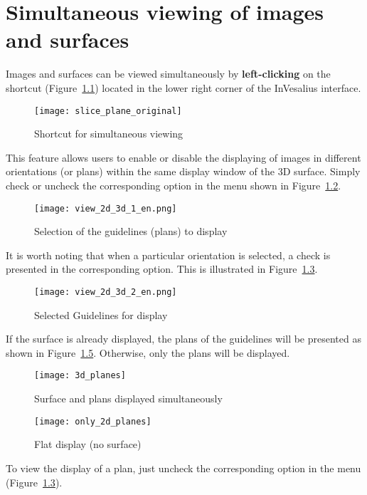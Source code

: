 \chapter{Simultaneous viewing of images and surfaces}

Images and surfaces can be viewed simultaneously by \textbf{left-clicking} on the shortcut (Figure~\ref{fig:slice_plane_original}) located in the lower right corner of the InVesalius interface.

\begin{figure}[!htb]
\centering
\texttt{[image: slice\_plane\_original]}
\caption{Shortcut for simultaneous viewing}
\label{fig:slice_plane_original}
\end{figure}

This feature allows users to enable or disable the displaying of images in different orientations (or plans) within the same display window of the 3D surface. Simply check or uncheck the corresponding option in the menu shown in Figure~\ref{fig:view_2d_3d_1}.

\begin{figure}[!htb]
\centering
\texttt{[image: view\_2d\_3d\_1\_en.png]}
\caption{Selection of the guidelines (plans) to display}
\label{fig:view_2d_3d_1}
\end{figure}

It is worth noting that when a particular orientation is selected, a check is presented in the corresponding option. This is illustrated in Figure~\ref{fig:view_2d_3d_2}.

\begin{figure}[!htb]
\centering
\texttt{[image: view\_2d\_3d\_2\_en.png]}
\caption{Selected Guidelines for display}
\label{fig:view_2d_3d_2}
\end{figure}

\newpage

If the surface is already displayed, the plans of the guidelines will be presented as shown in Figure~\ref{fig:only_2d_planes}. Otherwise, only the plans will be displayed.

\begin{figure}[!htb]
\centering
\texttt{[image: 3d\_planes]}
\caption{Surface and plans displayed simultaneously}
\label{fig:3d_planes}
\end{figure}

\begin{figure}[!htb]
\centering
\texttt{[image: only\_2d\_planes]}
\caption{Flat display (no surface)}
\label{fig:only_2d_planes}
\end{figure}

\newpage

To view the display of a plan, just uncheck the corresponding option in the menu (Figure~\ref{fig:view_2d_3d_2}).
